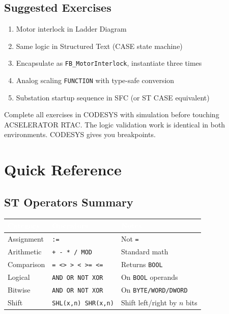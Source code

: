 \documentclass[12pt,twoside,openright]{memoir}
\begin{document}
\section{Suggested Exercises}

\begin{enumerate}
  \item Motor interlock in Ladder Diagram
  \item Same logic in Structured Text (CASE state machine)
  \item Encapsulate as \texttt{FB\_MotorInterlock}, instantiate three times
  \item Analog scaling \texttt{FUNCTION} with type-safe conversion
  \item Substation startup sequence in SFC (or ST CASE equivalent)
\end{enumerate}

\begin{protip}
Complete all exercises in CODESYS with simulation before touching ACSELERATOR RTAC. The logic validation work is identical in both environments. CODESYS gives you breakpoints.
\end{protip}

\appendix
\chapter{Quick Reference}

\section{ST Operators Summary}

\begin{center}
\begin{tabular}{L{3cm} L{3cm} L{5cm}}
\toprule
{} \textcolor{white}{\textbf{Category}} & \textcolor{white}{\textbf{Operators}} & \textcolor{white}{\textbf{Notes}} \\
\midrule
{} Assignment    & \texttt{:=}                  & Not \texttt{=} \\
Arithmetic    & \texttt{+ - * / MOD}         & Standard math \\
 Comparison    & \texttt{= <> > < >= <=}      & Returns \texttt{BOOL} \\
Logical       & \texttt{AND OR NOT XOR}      & On \texttt{BOOL} operands \\
 Bitwise       & \texttt{AND OR NOT XOR}      & On \texttt{BYTE/WORD/DWORD} \\
Shift         & \texttt{SHL(x,n) SHR(x,n)}  & Shift left/right by $n$ bits \\
\bottomrule
\end{tabular}
\end{center}
\end{document}
